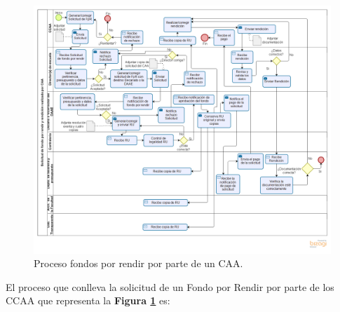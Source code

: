 \begin{figure}[tb!]
    \hspace{-9mm}
    \includegraphics[width=1.1\textwidth]{Imagenes/Solicitud_CCAA_Rendicion.png}
    \caption{\label{fig: Solicitud_CAA}Proceso fondos por rendir por parte de un CAA.}
\end{figure}

El proceso que conlleva la solicitud de un Fondo por Rendir por parte de los CCAA que representa la \textbf{Figura \ref{fig: Solicitud_CAA}} es:

